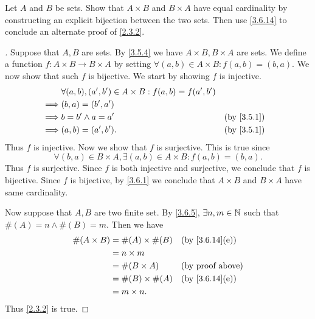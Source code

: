 \begin{ex}\label{ex:3.6.5}
	Let \(A\) and \(B\) be sets.
	Show that \(A \times B\) and \(B \times A\) have equal cardinality by constructing an explicit bijection between the two sets.
	Then use \cref{3.6.14} to conclude an alternate proof of \cref{2.3.2}.
\end{ex}

\begin{proof}[]
	Suppose that \(A, B\) are sets.
	By \cref{3.5.4} we have \(A \times B, B \times A\) are sets.
	We define a function \(f : A \times B \to B \times A\) by setting \(\forall (a, b) \in A \times B : f(a, b) = (b, a)\).
	We now show that such \(f\) is bijective.
	We start by showing \(f\) is injective.
	\begin{align*}
		         & \forall (a, b), (a', b') \in A \times B : f(a, b) = f(a', b')                 \\
		\implies & (b, a) = (b', a')                                                             \\
		\implies & b = b' \land a = a'                                           &  & \by{3.5.1} \\
		\implies & (a, b) = (a', b').                                            &  & \by{3.5.1}
	\end{align*}
	Thus \(f\) is injective.
	Now we show that \(f\) is surjective.
	This is true since
	\[
		\forall (b, a) \in B \times A, \exists (a, b) \in A \times B : f(a, b) = (b, a).
	\]
	Thus \(f\) is surjective.
	Since \(f\) is both injective and surjective, we conclude that \(f\) is bijective.
	Since \(f\) is bijective, by \cref{3.6.1} we conclude that \(A \times B\) and \(B \times A\) have same cardinality.

	Now suppose that \(A, B\) are two finite set.
	By \cref{3.6.5}, \(\exists n, m \in \mathbb{N}\) such that \(\#(A) = n \land \#(B) = m\).
	Then we have
	\begin{align*}
		\#(A \times B) & = \#(A) \times \#(B) &  & \text{(by \cref{3.6.14}(e))} \\
		               & = n \times m                                           \\
		               & = \#(B \times A)     &  & \text{(by proof above)}      \\
		               & = \#(B) \times \#(A) &  & \text{(by \cref{3.6.14}(e))} \\
		               & = m \times n.
	\end{align*}
	Thus \cref{2.3.2} is true.
\end{proof}


